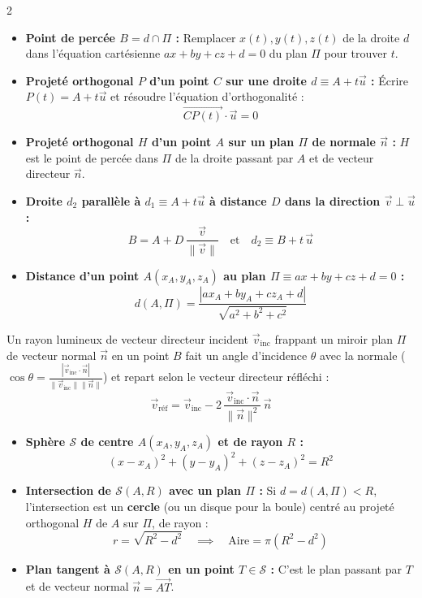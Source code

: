 {\begin{multicols}{2}
\begin{itemize}[leftmargin=1.2em, itemsep=2pt, topsep=2pt]
    \item \textbf{Point de percée $B = d \cap \Pi$ :} Remplacer $x(t), y(t), z(t)$ de la droite $d$ dans l'équation cartésienne $ax+by+cz+d=0$ du plan $\Pi$ pour trouver $t$.
    \item \textbf{Projeté orthogonal $P$ d'un point $C$ sur une droite $d \equiv A + t\vec{u}$ :} Écrire $P(t) = A + t\vec{u}$ et résoudre l'équation d'orthogonalité :
    \[
        \overrightarrow{CP(t)} \cdot \vec{u} = 0
    \]
    \item \textbf{Projeté orthogonal $H$ d'un point $A$ sur un plan $\Pi$ de normale $\vec{n}$ :} $H$ est le point de percée dans $\Pi$ de la droite passant par $A$ et de vecteur directeur $\vec{n}$.
    \item \textbf{Droite $d_2$ parallèle à $d_1 \equiv A + t\vec{u}$ à distance $D$ dans la direction $\vec{v} \perp \vec{u}$ :}
    \[
        B = A + D\,\frac{\vec{v}}{\|\vec{v}\|} \quad \text{et} \quad d_2 \equiv B + t\,\vec{u}
    \]
    \item \textbf{Distance d'un point $A(x_A, y_A, z_A)$ au plan $\Pi \equiv ax + by + cz + d = 0$ :}
    \[
        d(A, \Pi) = \frac{|ax_A + by_A + cz_A + d|}{\sqrt{a^2 + b^2 + c^2}}
    \]
\end{itemize}

\vspace{4pt}
Un rayon lumineux de vecteur directeur incident $\vec{v}_{\text{inc}}$ frappant un miroir plan $\Pi$ de vecteur normal $\vec{n}$ en un point $B$ fait un angle d'incidence $\theta$ avec la normale ($\cos\theta = \frac{|\vec{v}_{\text{inc}}\cdot\vec{n}|}{\|\vec{v}_{\text{inc}}\|\|\vec{n}\|}$) et repart selon le vecteur directeur réfléchi :
\[
    \vec{v}_{\text{réf}} = \vec{v}_{\text{inc}} - 2\,\frac{\vec{v}_{\text{inc}} \cdot \vec{n}}{\|\vec{n}\|^2}\,\vec{n}
\]

\vspace{4pt}
\begin{itemize}[leftmargin=1.2em, itemsep=2pt, topsep=2pt]
    \item \textbf{Sphère $\mathcal{S}$ de centre $A(x_A, y_A, z_A)$ et de rayon $R$ :}
    \[
        (x - x_A)^2 + (y - y_A)^2 + (z - z_A)^2 = R^2
    \]
    \item \textbf{Intersection de $\mathcal{S}(A, R)$ avec un plan $\Pi$ :} Si $d = d(A, \Pi) < R$, l'intersection est un \textbf{cercle} (ou un disque pour la boule) centré au projeté orthogonal $H$ de $A$ sur $\Pi$, de rayon :
    \[
        r = \sqrt{R^2 - d^2} \quad \implies \quad \text{Aire} = \pi(R^2 - d^2)
    \]
    \item \textbf{Plan tangent à $\mathcal{S}(A,R)$ en un point $T \in \mathcal{S}$ :} C'est le plan passant par $T$ et de vecteur normal $\vec{n} = \overrightarrow{AT}$.
\end{itemize}

\end{multicols}
}

\restoregeometry
